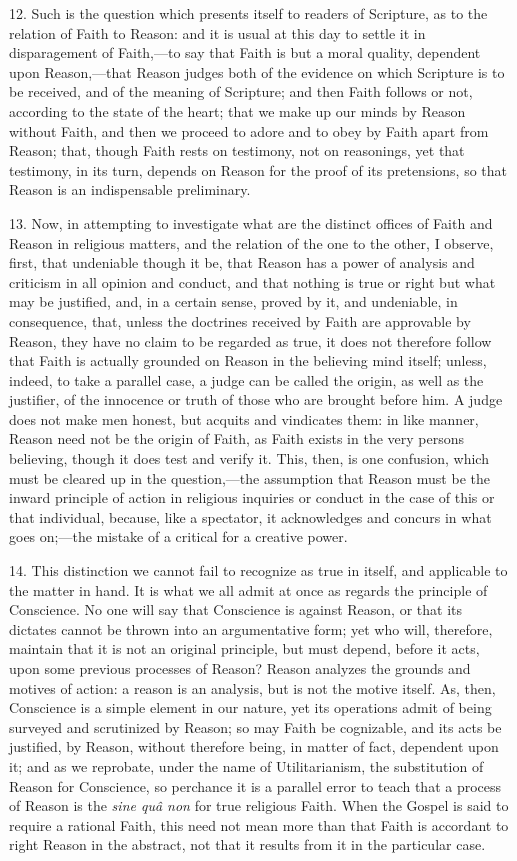 12. Such is the question which presents itself to readers of
Scripture, as to the relation of Faith to Reason: and it is usual at
this day to settle it in disparagement of Faith,—to say that Faith
is but a moral quality, dependent upon Reason,—that Reason judges
both of the evidence on which Scripture is to be received, and of the
meaning of Scripture; and then Faith follows or not, according to the
state of the heart; that we make up our minds by Reason without Faith,
and then we proceed to adore and to obey by Faith apart from Reason;
that, though Faith rests on testimony, not on reasonings, yet that
testimony, in its turn, depends on Reason for the proof of its
pretensions, so that Reason is an indispensable preliminary.

13. Now, in attempting to investigate what are the distinct offices
of Faith and Reason in religious matters, and the relation of the one
to the other, I observe, first, that undeniable though it be, that
Reason has a power of analysis and criticism in all opinion and
conduct, and that nothing is true or right but what may be justified,
and, in a certain sense, proved by it, and undeniable, in consequence,
that, unless the doctrines received by Faith are approvable by Reason,
they have no claim to be regarded as true, it does not therefore
follow that Faith is actually grounded on Reason in the believing mind
itself; unless, indeed, to take a parallel case, a judge can be called
the origin, as well as the justifier, of the innocence or truth of
those who are brought before him. A judge does not make men honest,
but acquits and vindicates them: in like manner, Reason need not be
the origin of Faith, as Faith exists in the very persons believing,
though it does test and verify it. This, then, is one confusion, which
must be cleared up in the question,—the assumption that Reason must
be the inward principle of action in religious inquiries or conduct in
the case of this or that individual, because, like a spectator, it
acknowledges and concurs in what goes on;—the mistake of a critical
for a creative power.

14. This distinction we cannot fail to recognize as true in itself,
and applicable to the matter in hand. It is what we all admit at once
as regards the principle of Conscience. No one will say that
Conscience is against Reason, or that its dictates cannot be thrown
into an argumentative form; yet who will, therefore, maintain that it
is not an original principle, but must depend, before it acts, upon
some previous processes of Reason? Reason analyzes the grounds and
motives of action: a reason is an analysis, but is not the motive
itself. As, then, Conscience is a simple element in our nature, yet
its operations admit of being surveyed and scrutinized by Reason; so
may Faith be cognizable, and its acts be justified, by Reason, without
therefore being, in matter of fact, dependent upon it; and as we
reprobate, under the name of Utilitarianism, the substitution of
Reason for Conscience, so perchance it is a parallel error to teach
that a process of Reason is the \emph{sine quâ non} for true
religious Faith. When the Gospel is said to require a rational Faith,
this need not mean more than that Faith is accordant to right Reason
in the abstract, not that it results from it in the particular case.

